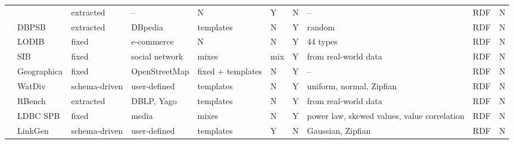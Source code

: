 \begin{sidewaystable}
{\begin{tabular}{| c | p{2.2cm} | p{2cm} |  p{2.2cm} | l |  l | l | p{3cm} | p{1.4cm} | l | }
\cline{2-10}
 & \cite{Duan:2011:AOC:1989323.1989340} & extracted & -- & N & Y &N & -- &  RDF & N    \\
\cline{2-10}
 & DBPSB & extracted & DBpedia &  templates & N & Y & random &  RDF & N   \\
\cline{2-10}
 & LODIB & fixed & e-commerce &  N & N & Y & 44 types &  RDF & N   \\
\cline{2-10}
 & SIB & fixed & social network &  mixes & mix & Y & from real-world data &  RDF & N   \\
\cline{2-10}
 & Geographica & fixed & OpenStreetMap  & fixed + templates  & N & Y & -- &  RDF & N   \\
\cline{2-10}
 & WatDiv & schema-driven & user-defined  & templates & N & Y & uniform, normal, Zipfian &  RDF & N   \\
\cline{2-10}
 & RBench & extracted & DBLP, Yago  & templates & N & Y & from real-world data &  RDF & N  \\
\cline{2-10}
 & LDBC SPB & fixed & media  & mixes & N & Y & power law, skewed values, value correlation &  RDF & N  \\
\cline{2-10}
 & LinkGen & schema-driven & user-defined & templates & Y  & N & Gaussian, Zipfian& RDF & N\\
\hline
\end{tabular} }
\label{tab:comparisonCharacteristicsA}
\end{sidewaystable}

